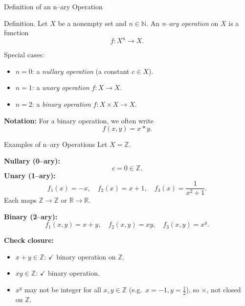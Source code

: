 
\date{15 October 2025}



\begin{frame}
  \cmctitleframe
\end{frame}

\begin{frame}{Definition of an n–ary Operation}
\begin{block}{Definition.}
Let \( X \) be a nonempty set and \( n \in \mathbb{N} \).
An \emph{n–ary operation} on \( X \) is a function
\[
f : X^n \longrightarrow X.
\]
\end{block}

\begin{block}{Special cases:}
\begin{itemize}
  \item \( n = 0 \): a \emph{nullary operation} (a constant \( c \in X \)).
  \item \( n = 1 \): a \emph{unary operation} \( f: X \to X \).
  \item \( n = 2 \): a \emph{binary operation} \( f: X \times X \to X \).
\end{itemize}

\textbf{Notation:} For a binary operation, we often write
\[
f(x,y) = x * y.
\]

\end{block}
\end{frame}

\begin{frame}{Examples of n–ary Operations}
\vspace{-0.3cm}
Let \( X = \mathbb{Z} \).

\textbf{Nullary (0–ary):}
\[
c = 0 \in \mathbb{Z}.
\]
\textbf{Unary (1–ary):}
\[
f_1(x) = -x, \quad f_2(x) = x + 1, \quad f_3(x) = \frac{1}{x^2 + 1}.
\]
Each maps \( \mathbb{Z} \to \mathbb{Z} \) or \( \mathbb{R} \to \mathbb{R} \).

\textbf{Binary (2–ary):}
\[
f_1(x,y) = x + y, \quad f_2(x,y) = xy, \quad f_3(x,y) = x^y.
\]

\textbf{Check closure:}
\begin{itemize}
  \item \(x+y \in \mathbb{Z}\): $\checkmark$ binary operation on \(\mathbb{Z}\).
  \item \(xy \in \mathbb{Z}\): $\checkmark$ binary operation.
  \item \(x^y\) may not be integer for all \(x,y\in\mathbb{Z}\) (e.g.\ \(x=-1, y=\frac12\)), so $\times$, not closed on \(\mathbb{Z}\).
\end{itemize}
\end{frame}


